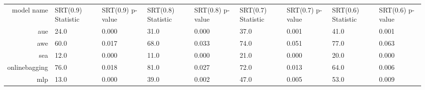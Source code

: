 \begin{tabular}{|r|l|l|l|l|l|l|l|l|}
  \hline
  model name & SRT(0.9) Statistic & SRT(0.9) p-value & SRT(0.8) Statistic & SRT(0.8) p-value & SRT(0.7) Statistic & SRT(0.7) p-value & SRT(0.6) Statistic & SRT(0.6) p-value \\ 
  aue & 24.0 & 0.000 & 31.0 & 0.000 & 37.0 & 0.001 & 41.0 & 0.001 \\ 
  awe & 60.0 & 0.017 & 68.0 & 0.033 & 74.0 & 0.051 & 77.0 & 0.063 \\ 
  sea & 12.0 & 0.000 & 11.0 & 0.000 & 21.0 & 0.000 & 20.0 & 0.000 \\ 
  onlinebagging & 76.0 & 0.018 & 81.0 & 0.027 & 72.0 & 0.013 & 64.0 & 0.006 \\ 
  mlp & 13.0 & 0.000 & 39.0 & 0.002 & 47.0 & 0.005 & 53.0 & 0.009 \\ 
\end{tabular}
